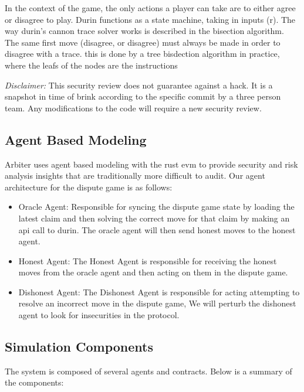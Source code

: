 \documentclass[14pt]{extarticle}
\def\tightlist{}
\begin{document}
In the context of the game, the only actions a player can take are to either agree or disagree to play. Durin functions as a state machine, taking in inputs (r).
The way durin's cannon trace solver works is described in the bisection algorithm. The same first move (disagree, or disagree) must always be made in order to disagree with a trace.
this is done by a tree bisdection algorithm in practice, where the leafs of the nodes are the instructions 

\emph{Disclaimer:} This security review does not guarantee against a
hack. It is a snapshot in time of brink according to the specific commit
by a three person team. Any modifications to the code will require a new
security review.

\subsection{Agent Based Modeling}\label{agent-based-modeling}

Arbiter uses agent based modeling with the rust evm to provide security
and risk analysis insights that are traditionally more difficult to
audit. Our agent architecture for the dispute game is as follows:

\begin{itemize}
\tightlist
\item
  Oracle Agent: Responsible for syncing the dispute game state by
  loading the latest claim and then solving the correct move for that
  claim by making an api call to durin. The oracle agent will then send
  honest moves to the honest agent.
\item
  Honest Agent: The Honest Agent is responsible for receiving the honest
  moves from the oracle agent and then acting on them in the dispute
  game.
\item
  Dishonest Agent: The Dishonest Agent is responsible for acting
  attempting to resolve an incorrect move in the dispute game, We will
  perturb the dishonest agent to look for insecurities in the protocol.
\end{itemize}

\subsection{Simulation Components}\label{simulation-components}

The system is composed of several agents and contracts. Below is a summary of the components:
\end{document}
